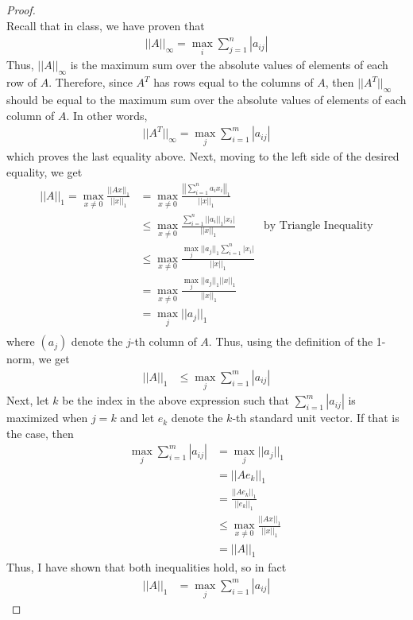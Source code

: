 \documentclass[10pt,a4paper]{article}
\theoremstyle{definition}
\theoremstyle{definition}
\numberwithin{equation}{section}
\begin{document}
\begin{proof}$ $
\\Recall that in class, we have proven that 
\begin{align*}
||A||_\infty = \max_i \sum_{j = 1}^n |a_{ij}|
\end{align*}
Thus, $||A||_\infty$ is the maximum sum over the absolute values of elements of each row of $A$. Therefore, since $A^T$ has rows equal to the columns of $A$, then $||A^T||_\infty$ should be equal to the maximum sum over the absolute values of elements of each column of $A$. In other words,
\begin{align*}
||A^T||_\infty = \max_j \sum_{i = 1}^m |a_{ij}|
\end{align*}
which proves the last equality above. Next, moving to the left side of the desired equality, we get
\begin{align*}
||A||_1 = \max_{x \neq 0} \frac{||Ax||_1}{||x||_1} &= \max_{x \neq 0} \frac{\displaystyle \left|\left|\sum_{i = 1}^n a_i x_i\right|\right|_1}{||x||_1}\\
&\leq \max_{x \neq 0} \frac{\displaystyle \sum_{i = 1}^n ||a_i||_1 |x_i|}{||x||_1} &\text{by Triangle Inequality}\\
&\leq \max_{x \neq 0} \frac{\displaystyle \max_j ||a_j||_1 \sum_{i = 1}^n |x_i|}{||x||_1}\\
&= \max_{x \neq 0} \frac{\displaystyle \max_j ||a_j||_1 ||x||_1}{||x||_1}\\
&= \max_{j} ||a_j||_1\\
\end{align*}
where $(a_j)$ denote the $j$-th column of $A$. Thus, using the definition of the 1-norm, we get
\begin{align*}
||A||_1 &\leq \max_j \sum_{i = 1}^m |a_{ij}|
\end{align*}
Next, let $k$ be the index in the above expression such that $\sum_{i = 1}^m |a_{ij}|$ is maximized when $j = k$ and let $e_k$ denote the $k$-th standard unit vector. If that is the case, then 
\begin{align*}
\max_j \sum_{i = 1}^m |a_{ij}| &= \max_j ||a_j||_1\\
&= ||Ae_k||_1\\
&= \frac{||Ae_k||_1}{||e_k||_1}\\
&\leq \max_{x \neq 0} \frac{||Ax||_1}{||x||_1}\\
&= ||A||_1
\end{align*}
Thus, I have shown that both inequalities hold, so in fact
\begin{align*}
||A||_1 &= \max_j \sum_{i = 1}^m |a_{ij}|
\end{align*}
\end{proof}
\end{document}
